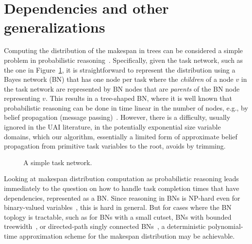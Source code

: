 \documentclass[review]{elsarticle}
\begin{document}
\section{Dependencies and other generalizations}\label{sec:generalizations}

Computing the distribution of the makespan in trees can be considered a simple problem in probabilistic reasoning~\cite{Pearl}.
Specifically, given the task network, such as the one in Figure~\ref{fig:task-network},
it is straightforward to represent the 
distribution using a Bayes network (BN) that has one node
per task where the {\em children} of a node $v$ in the 
task network are represented by BN nodes that are {\em parents} of
the BN node representing $v$. This results in a tree-shaped BN, 
where it is well known that probabilistic reasoning can be done in time linear
in the number of nodes, e.g., by belief propagation (message passing)~\cite{Pearl,Kim}. 
However, there is a difficulty, usually ignored in the UAI literature, in the potentially exponential size variable domains, which our algorithm, essentially a limited form
of approximate belief propagation from primitive task variables to the root, avoids by trimming.

\begin{figure}
\centering
{}
\caption{A simple task network.}
\label{fig:task-network}
\end{figure}

Looking at makespan distribution computation as probabilistic reasoning leads immediately to 
the question on how to handle task completion times that have dependencies, represented as a BN. 
Since reasoning in BNs is NP-hard even for binary-valued 
variables~\cite{Dagum.aij,Cooper.ai}, 
this is hard in general.
But for cases where the BN toplogy is tractable, such as for BNs 
with a small cutset,
BNs with bounded treewidth~\cite{Bodlaender:2006:TCA:2092758.2092759},
or directed-path singly connected BNs~\cite{ShimonyDomshlak.aiRN2003},
a deterministic polynomial-time approximation scheme for 
the makespan distribution may be achievable.
\end{document}
